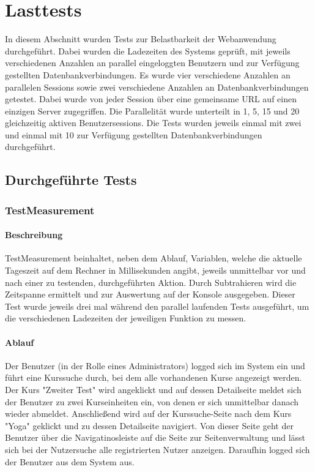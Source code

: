 \chapter{Lasttests}

In diesem Abschnitt wurden Tests zur Belastbarkeit der Webanwendung durchgeführt. Dabei wurden die Ladezeiten des Systems 
geprüft, mit jeweils verschiedenen Anzahlen an parallel eingeloggten Benutzern und zur Verfügung gestellten Datenbankverbindungen.
Es wurde vier verschiedene Anzahlen an parallelen Sessions sowie zwei verschiedene Anzahlen an Datenbankverbindungen getestet. Dabei 
wurde von jeder Session über eine gemeinsame URL auf einen einzigen Server zugegriffen. Die Parallelität wurde unterteilt in 1, 5, 15 
und 20 gleichzeitig aktiven Benutzersessions. Die Tests wurden jeweils einmal mit zwei und einmal mit 10 zur Verfügung gestellten 
Datenbankverbindungen durchgeführt.

\section{Durchgeführte Tests}

\subsection{TestMeasurement}

\subsubsection{Beschreibung}

TestMeasurement beinhaltet, neben dem Ablauf, Variablen, welche die aktuelle Tageszeit auf dem Rechner in Millisekunden angibt, 
jeweils unmittelbar vor und nach einer zu testenden, durchgeführten Aktion. Durch Subtrahieren wird die Zeitspanne ermittelt und zur 
Auswertung auf der Konsole ausgegeben. Dieser Test wurde jeweils drei mal während den parallel laufenden Tests ausgeführt, um die 
verschiedenen Ladezeiten der jeweiligen Funktion zu messen.

\subsubsection{Ablauf}

Der Benutzer (in der Rolle eines Administrators) logged sich im System ein und führt eine Kurssuche durch, bei dem alle vorhandenen Kurse angezeigt werden. Der Kurs "Zweiter Test" wird angeklickt und auf dessen Detailseite meldet sich der Benutzer zu zwei Kurseinheiten ein, von denen er sich unmittelbar danach wieder abmeldet. Anschließend wird auf der Kurssuche-Seite nach dem Kurs "Yoga" geklickt und zu dessen Detailseite navigiert. Von dieser Seite geht der Benutzer über die Navigatinosleiste auf die Seite zur Seitenverwaltung und lässt sich bei der Nutzersuche alle registrierten Nutzer anzeigen. Daraufhin logged sich der Benutzer aus dem System aus.


